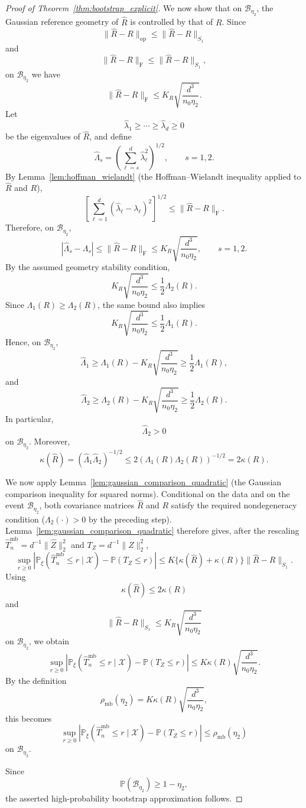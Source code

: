 \documentclass[
  12pt]{article}
\theoremstyle{plain}
\theoremstyle{definition}
\theoremstyle{remark}
\begin{document}
\begin{proof}[Proof of Theorem~\ref{thm:bootstrap_explicit}]
We now show that on \(\mathcal B_{\eta_2}\), the Gaussian reference geometry of
\(\widehat R\) is controlled by that of \(R\). Since
\[
\|\widehat R-R\|_{\mathrm{op}}
\le
\|\widehat R-R\|_{S_1}
\]
and
\[
\|\widehat R-R\|_{\mathrm F}
\le
\|\widehat R-R\|_{S_1},
\]
on \(\mathcal B_{\eta_2}\) we have
\[
\|\widehat R-R\|_{\mathrm F}
\le
K_R\sqrt{\frac{d^3}{n_0\eta_2}}.
\]
Let
\[
\widehat\lambda_1\ge\cdots\ge\widehat\lambda_d\ge0
\]
be the eigenvalues of \(\widehat R\), and define
\[
\widehat\Lambda_s
=
\left(
\sum_{\ell=s}^d\widehat\lambda_\ell^2
\right)^{1/2},
\qquad s=1,2.
\]
By Lemma~\ref{lem:hoffman_wielandt} (the Hoffman--Wielandt inequality applied to
\(\widehat R\) and \(R\)),
\[
\left[
\sum_{\ell=1}^d
(\widehat\lambda_\ell-\lambda_\ell)^2
\right]^{1/2}
\le
\|\widehat R-R\|_{\mathrm F}.
\]
Therefore, on \(\mathcal B_{\eta_2}\),
\[
|\widehat\Lambda_s-\Lambda_s|
\le
\|\widehat R-R\|_{\mathrm F}
\le
K_R\sqrt{\frac{d^3}{n_0\eta_2}},
\qquad s=1,2.
\]
By the assumed geometry stability condition,
\[
K_R\sqrt{\frac{d^3}{n_0\eta_2}}
\le
\frac12\Lambda_2(R).
\]
Since \(\Lambda_1(R)\ge\Lambda_2(R)\), the same bound also implies
\[
K_R\sqrt{\frac{d^3}{n_0\eta_2}}
\le
\frac12\Lambda_1(R).
\]
Hence, on \(\mathcal B_{\eta_2}\),
\[
\widehat\Lambda_1
\ge
\Lambda_1(R)
-
K_R\sqrt{\frac{d^3}{n_0\eta_2}}
\ge
\frac12\Lambda_1(R),
\]
and
\[
\widehat\Lambda_2
\ge
\Lambda_2(R)
-
K_R\sqrt{\frac{d^3}{n_0\eta_2}}
\ge
\frac12\Lambda_2(R).
\]
In particular,
\[
\widehat\Lambda_2>0
\]
on \(\mathcal B_{\eta_2}\). Moreover,
\[
\kappa(\widehat R)
=
(\widehat\Lambda_1\widehat\Lambda_2)^{-1/2}
\le
2(\Lambda_1(R)\Lambda_2(R))^{-1/2}
=
2\kappa(R).
\]

We now apply Lemma~\ref{lem:gaussian_comparison_quadratic} (the Gaussian
comparison inequality for squared norms). Conditional on the data and on the
event \(\mathcal B_{\eta_2}\), both covariance matrices \(\widehat R\) and
\(R\) satisfy the required nondegeneracy condition (\(\Lambda_2(\cdot)>0\) by
the preceding step). Lemma~\ref{lem:gaussian_comparison_quadratic} therefore
gives, after the rescaling \(\widehat T_n^{\mathrm{mb}}=d^{-1}\|\widehat Z\|_2^2\)
and \(T_Z=d^{-1}\|Z\|_2^2\),
\[
\sup_{r\ge0}
\left|
\mathbb P_\xi
\left(
\widehat T_n^{\mathrm{mb}}\le r\mid\mathcal X
\right)
-
\mathbb P(T_Z\le r)
\right|
\le
K
\{\kappa(\widehat R)+\kappa(R)\}
\|\widehat R-R\|_{S_1}.
\]
Using
\[
\kappa(\widehat R)\le 2\kappa(R)
\]
and
\[
\|\widehat R-R\|_{S_1}
\le
K_R\sqrt{\frac{d^3}{n_0\eta_2}}
\]
on \(\mathcal B_{\eta_2}\), we obtain
\[
\sup_{r\ge0}
\left|
\mathbb P_\xi
\left(
\widehat T_n^{\mathrm{mb}}\le r\mid\mathcal X
\right)
-
\mathbb P(T_Z\le r)
\right|
\le
K\kappa(R)
\sqrt{\frac{d^3}{n_0\eta_2}}.
\]
By the definition
\[
\rho_{\mathrm{mb}}(\eta_2)
=
K\kappa(R)
\sqrt{\frac{d^3}{n_0\eta_2}},
\]
this becomes
\[
\sup_{r\ge0}
\left|
\mathbb P_\xi
\left(
\widehat T_n^{\mathrm{mb}}\le r\mid\mathcal X
\right)
-
\mathbb P(T_Z\le r)
\right|
\le
\rho_{\mathrm{mb}}(\eta_2)
\]
on \(\mathcal B_{\eta_2}\).

Since
\[
\mathbb P(\mathcal B_{\eta_2})\ge 1-\eta_2,
\]
the asserted high-probability bootstrap approximation follows.
\end{proof}
\end{document}
